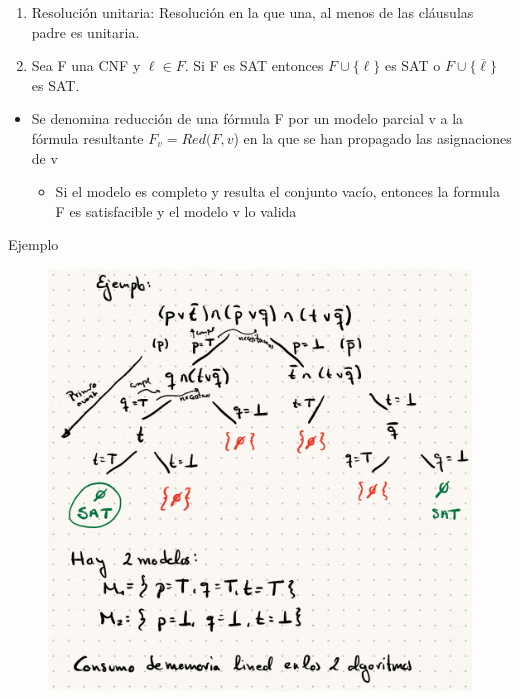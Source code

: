 \documentclass[12pt, twoside, openright]{report} %
\begin{document}
  \begin{enumerate}
  \def\labelenumi{\arabic{enumi}.}

  \item
    Resolución unitaria: Resolución en la que una, al menos de las
    cláusulas padre es unitaria.
  \item
    Sea F una CNF y \(\ell \in F\). Si F es SAT entonces
    \(F \cup \{ \ell \}\) es SAT o \(F \cup \{ \overline{\ell} \}\) es
    SAT.
  \end{enumerate}

  \begin{itemize}
  \item
    Se denomina reducción de una fórmula F por un modelo parcial v a la
    fórmula resultante \(F_v = Red(F, v\)) en la que se han propagado
    las asignaciones de v

    \begin{itemize}
  
    \item
      Si el modelo es completo y resulta el conjunto vacío, entonces la
      formula F es satisfacible y el modelo v lo valida
    \end{itemize}
  \end{itemize}

  Ejemplo
  \begin{figure}[H]
	{\includegraphics[scale=.35]{Untitled 34.png}}
\end{figure}
\end{document}
